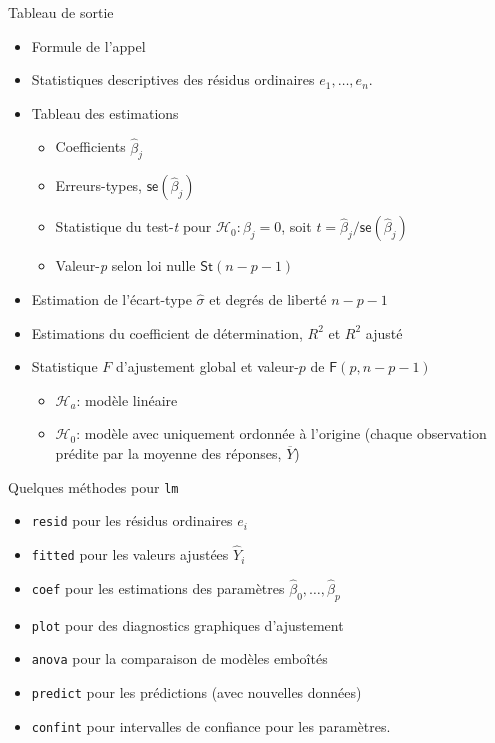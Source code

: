 \documentclass[
  ignorenonframetext,
]{beamer}
\providecommand{\tightlist}{%
  \setlength{\itemsep}{0pt}\setlength{\parskip}{0pt}}\usepackage{longtable,booktabs,array}
\begin{document}
\begin{frame}{Tableau de sortie}
\label{tableau-de-sortie}
\begin{itemize}
\tightlist
\item
  Formule de l'appel
\item
  Statistiques descriptives des résidus ordinaires \(e_1, \ldots, e_n\).
\item
  Tableau des estimations

  \begin{itemize}
  \tightlist
  \item
    Coefficients \(\widehat{\beta}_j\)
  \item
    Erreurs-types, \(\mathsf{se}(\widehat{\beta}_j)\)
  \item
    Statistique du test-\emph{t} pour \(\mathscr{H}_0: \beta_j=0\), soit
    \(t=\widehat{\beta}_j/\mathsf{se}(\widehat{\beta}_j)\)
  \item
    Valeur-\emph{p} selon loi nulle \(\mathsf{St}(n-p-1)\)
  \end{itemize}
\item
  Estimation de l'écart-type \(\widehat{\sigma}\) et degrés de liberté
  \(n-p-1\)
\item
  Estimations du coefficient de détermination, \(R^2\) et \(R^2\) ajusté
\item
  Statistique \(F\) d'ajustement global et valeur-\(p\) de
  \(\mathsf{F}(p, n - p - 1)\)

  \begin{itemize}
  \tightlist
  \item
    \(\mathscr{H}_a\): modèle linéaire
  \item
    \(\mathscr{H}_0\): modèle avec uniquement ordonnée à l'origine
    (chaque observation prédite par la moyenne des réponses,
    \(\overline{Y}\))
  \end{itemize}
\end{itemize}

\normalsize
\end{frame}

\begin{frame}[fragile]{Quelques méthodes pour \texttt{lm}}
\label{quelques-muxe9thodes-pour-lm}
\begin{itemize}
\tightlist
\item
  \texttt{resid} pour les résidus ordinaires \(e_i\)
\item
  \texttt{fitted} pour les valeurs ajustées \(\widehat{Y}_i\)
\item
  \texttt{coef} pour les estimations des paramètres
  \(\widehat{\beta}_0, \ldots, \widehat{\beta}_p\)
\item
  \texttt{plot} pour des diagnostics graphiques d'ajustement
\item
  \texttt{anova} pour la comparaison de modèles emboîtés
\item
  \texttt{predict} pour les prédictions (avec nouvelles données)
\item
  \texttt{confint} pour intervalles de confiance pour les paramètres.
\end{itemize}
\end{frame}
\end{document}
